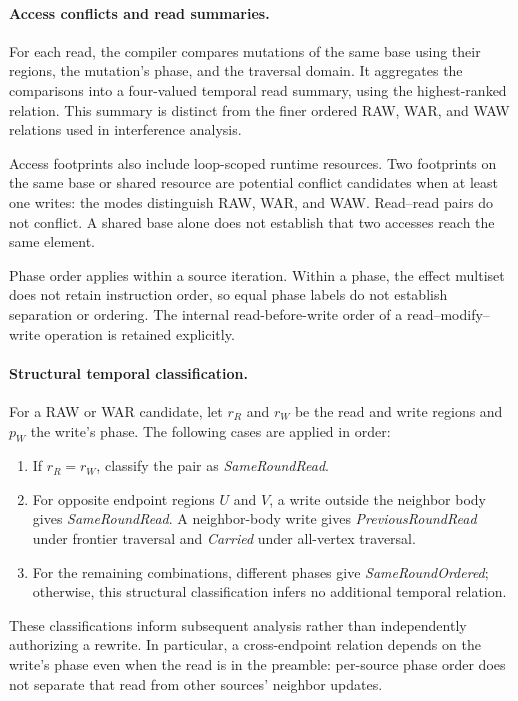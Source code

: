 \paragraph{Access conflicts and read summaries.}
For each read, the compiler compares mutations of the same base using
their regions, the mutation's phase, and the traversal domain. It
aggregates the comparisons into a four-valued temporal read summary,
using the highest-ranked relation. This summary is distinct from the
finer ordered RAW, WAR, and WAW relations used in interference analysis.

Access footprints also include loop-scoped runtime resources. Two
footprints on the same base or shared resource are potential conflict
candidates when at least one writes: the modes distinguish RAW, WAR,
and WAW. Read--read pairs do not conflict. A shared base alone does not
establish that two accesses reach the same element.

Phase order applies within a source iteration. Within a phase, the effect
multiset does not retain instruction order, so equal phase labels do not
establish separation or ordering. The internal read-before-write order
of a read--modify--write operation is retained explicitly.

\paragraph{Structural temporal classification.}
For a RAW or WAR candidate, let $r_R$ and $r_W$ be the read and write
regions and $p_W$ the write's phase. The following cases are applied in
order:
\begin{enumerate}
\item If $r_R=r_W$, classify the pair as \emph{SameRoundRead}.
\item For opposite endpoint regions $U$ and $V$, a write outside the
neighbor body gives \emph{SameRoundRead}. A neighbor-body write gives
\emph{PreviousRoundRead} under frontier traversal and \emph{Carried}
under all-vertex traversal.
\item For the remaining combinations, different phases give
\emph{SameRoundOrdered}; otherwise, this structural classification
infers no additional temporal relation.
\end{enumerate}
These classifications inform subsequent analysis rather than independently
authorizing a rewrite. In particular, a cross-endpoint relation depends on
the write's phase even when the read is in the preamble: per-source phase
order does not separate that read from other sources' neighbor updates.

